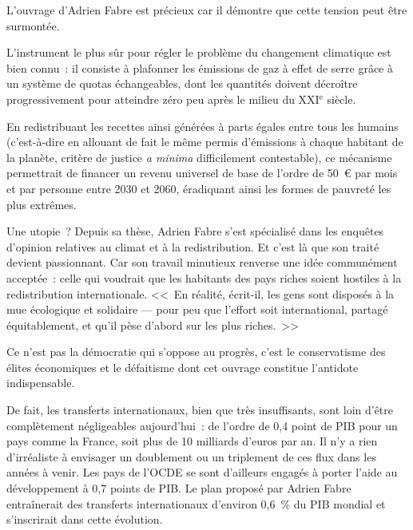 \documentclass[a5paper,french,openany]{memoir}
\begin{document}
L'ouvrage d'Adrien Fabre est précieux car il démontre que cette tension peut être surmontée. 

L'instrument le plus sûr pour régler le problème du changement climatique est bien connu~: il consiste à plafonner les émissions de gaz à effet de serre grâce à un système de quotas échangeables, dont les quantités doivent décroître progressivement pour atteindre zéro peu après le milieu du XXI$^\text{e}$ siècle. 

En redistribuant les recettes ainsi générées à parts égales entre tous les humains (c'est-à-dire en allouant de fait le même permis d'émissions à chaque habitant de la planète, critère de justice \textit{a minima} difficilement contestable), ce mécanisme permettrait de financer un revenu universel de base de l'ordre de 50~\euro{} par mois et par personne entre 2030 et 2060, éradiquant ainsi les formes de pauvreté les plus extrêmes. 

Une utopie~? Depuis sa thèse, Adrien Fabre s'est spécialisé dans les enquêtes d'opinion relatives au climat et à la redistribution. Et c'est là que son traité devient passionnant. Car son travail minutieux renverse une idée communément acceptée~: celle qui voudrait que les habitants des pays riches soient hostiles à la redistribution internationale. <<~En réalité, écrit-il, les gens sont disposés à la mue écologique et solidaire — pour peu que l'effort soit international, partagé équitablement, et qu'il pèse d'abord sur les plus riches.~>> 

Ce n'est pas la démocratie qui s'oppose au progrès, c'est le conservatisme des élites économiques et le défaitisme dont cet ouvrage constitue l'antidote indispensable.

De fait, les transferts internationaux, bien que très insuffisants, sont loin d'être complètement négligeables aujourd'hui~: de l'ordre de 0,4 point de PIB pour un pays comme la France, soit plus de 10 milliards d'euros par an. Il n'y a rien d'irréaliste à envisager un doublement ou un triplement de ces flux dans les années à venir. Les pays de l'OCDE se sont d'ailleurs engagés à porter l'aide au développement à 0,7 points de PIB. Le plan proposé par Adrien Fabre entraînerait des transferts internationaux d'environ 0,6~\% du PIB mondial et s'inscrirait dans cette évolution. 
\end{document}
